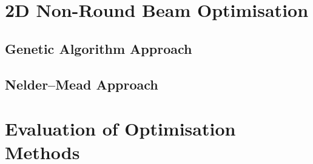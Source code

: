\documentclass[../main.tex]{subfiles}
\begin{document}
\section{2D Non-Round Beam Optimisation}

\subsection{Genetic Algorithm Approach}

\subsection{Nelder--Mead Approach}

\section{Evaluation of Optimisation Methods} 

 
\end{document}
